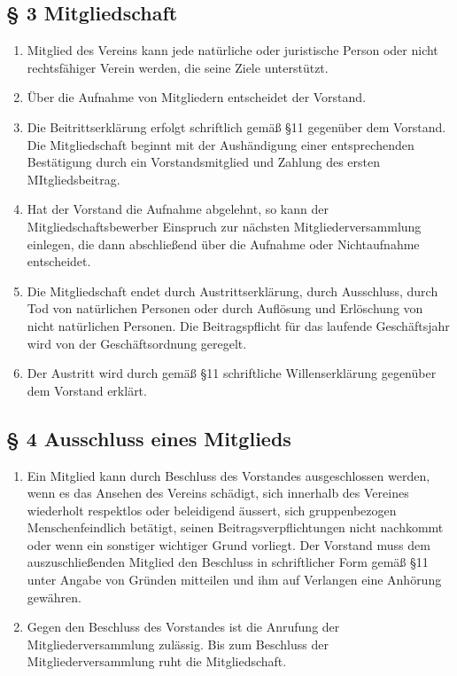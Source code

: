 \documentclass[10pt,a4paper]{scrartcl}
\begin{document}
\subsection*{§ 3 Mitgliedschaft}
\begin{enumerate}
	\item Mitglied des Vereins kann jede natürliche oder juristische Person oder
		nicht rechts\-fähiger Verein werden, die seine Ziele unterstützt.
	\item Über die Aufnahme von Mitgliedern entscheidet der Vorstand.
	\item Die Beitrittserklärung erfolgt schriftlich gemäß §11 gegenüber dem Vorstand. Die
		Mitgliedschaft beginnt mit der Aushändigung einer entsprechenden Bestätigung durch
		ein Vorstandsmitglied und Zahlung des ersten MItgliedsbeitrag.
	\item Hat der Vorstand die Aufnahme abgelehnt, so kann der Mitgliedschaftsbewerber Einspruch
		zur nächsten Mitgliederversammlung einlegen, die dann abschließend über die Aufnahme
		oder Nichtaufnahme entscheidet.
	\item Die Mitgliedschaft endet durch Austrittserklärung, durch Ausschluss, durch Tod von
		natür\-li\-chen Personen oder durch Auflösung und Erlöschung von nicht
		natür\-lichen Personen.
		Die Beitragspflicht für das laufende Geschäftsjahr wird von der Geschäftsordnung
		geregelt.
	\item Der Austritt wird durch gemäß §11 schriftliche Willenserklärung gegenüber dem Vorstand
		erklärt.
\end{enumerate}
\subsection*{§ 4 Ausschluss eines Mitglieds }
\begin{enumerate}
	\item Ein Mitglied kann durch Beschluss des Vorstandes ausgeschlossen werden, wenn es das
		Ansehen des Vereins schädigt, sich innerhalb des Vereines wiederholt respektlos oder 
		beleidigend äussert, sich gruppenbezogen Menschenfeindlich betätigt, seinen 
		Beitragsverpflichtungen nicht nachkommt oder
		wenn ein sonstiger wichtiger Grund vorliegt. Der Vorstand muss dem auszuschließenden
		Mitglied den Beschluss in schriftlicher Form gemäß §11 unter Angabe von Gründen
		mitteilen und ihm auf Verlangen eine Anhörung gewähren.
	\item Gegen den Beschluss des Vorstandes ist die Anrufung der Mitgliederversammlung
		zu\-läs\-sig. Bis zum Beschluss der Mitgliederversammlung ruht die Mitgliedschaft.
	
\end{enumerate}
\end{document}
